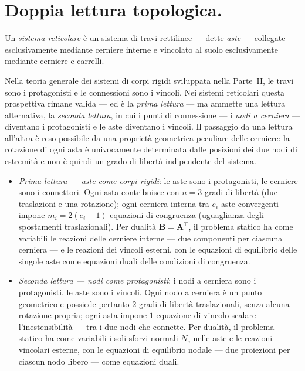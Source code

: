 \section{Doppia lettura topologica.}
\label{sec:doppia_lettura}
Un \emph{sistema reticolare} è un sistema di travi
rettilinee --- dette \emph{aste} --- collegate
esclusivamente mediante cerniere interne e vincolato
al suolo esclusivamente mediante cerniere e carrelli.

Nella teoria generale dei sistemi di corpi rigidi
sviluppata nella Parte~II, le travi sono i
protagonisti e le connessioni sono i vincoli.
Nei sistemi reticolari questa prospettiva rimane
valida --- ed è la \emph{prima lettura} --- ma
ammette una lettura alternativa, la
\emph{seconda lettura}, in cui i punti di
connessione --- i \emph{nodi a cerniera} ---
diventano i protagonisti e le aste diventano
i vincoli. Il passaggio da una lettura all'altra
è reso possibile da una proprietà geometrica
peculiare delle cerniere: la rotazione di ogni
asta è univocamente determinata dalle posizioni
dei due nodi di estremità e non è quindi un
grado di libertà indipendente del sistema.

\begin{itemize}[noitemsep]
	\item \emph{Prima lettura --- aste come corpi
		rigidi}: le aste sono i protagonisti, le cerniere
	sono i connettori. Ogni asta contribuisce con
	$n = 3$ gradi di libertà (due traslazioni e una
	rotazione); ogni cerniera interna tra $e_i$ aste
	convergenti impone $m_i = 2(e_i-1)$ equazioni
	di congruenza (uguaglianza degli spostamenti
	traslazionali). Per dualità $\bm{B}=\bm{A}^\top$,
	il problema statico ha come variabili le reazioni
	delle cerniere interne --- due componenti per
	ciascuna cerniera --- e le reazioni dei vincoli
	esterni, con le equazioni di equilibrio delle
	singole aste come equazioni duali delle condizioni
	di congruenza.
	
	\item \emph{Seconda lettura --- nodi come
		protagonisti}: i nodi a cerniera sono i
	protagonisti, le aste sono i vincoli. Ogni nodo
	a cerniera è un punto geometrico e possiede
	pertanto $2$ gradi di libertà traslazionali,
	senza alcuna rotazione propria; ogni asta impone
	$1$ equazione di vincolo scalare ---
	l'inestensibilità --- tra i due nodi che connette.
	Per dualità, il problema statico ha come variabili
	i soli sforzi normali $N_e$ nelle aste e le
	reazioni vincolari esterne, con le equazioni di
	equilibrio nodale --- due proiezioni per ciascun
	nodo libero --- come equazioni duali.
\end{itemize}


